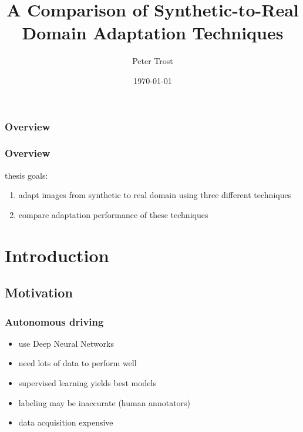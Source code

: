 \documentclass{beamer}
\title[A Comparison of Synthetic-to-Real Domain Adaptation Techniques]{A Comparison of Synthetic-to-Real Domain Adaptation Techniques} %
\author{Peter Trost} %
\institute[Universität Tübingen] %
{
Eberhard Karls Universität Tübingen \\
Mathematisch-Naturwissenschaftliche Fakultät\\
Wilhelm-Schickard-Institut für Informatik\\
Lernbasierte Computer Vision\\ %
\medskip
\textit{peter.trost@student.uni-tuebingen.de} %
}
\date{\today} %
\begin{document}
\begin{frame}
\titlepage %
\end{frame}

\begin{frame}
\frametitle{Overview} %
\tableofcontents %
\end{frame}

\begin{frame}
	\frametitle{Overview}
	thesis goals:
	\begin{enumerate}
		\item adapt images from synthetic to real domain using three different techniques
		\item compare adaptation performance of these techniques
	\end{enumerate}
\end{frame}

\section{Introduction}

\subsection{Motivation}

\begin{frame}
	\frametitle{Autonomous driving}
	\begin{itemize}
		\item use Deep Neural Networks
		\item need lots of data to perform well
		\item supervised learning yields best models
		\item labeling may be inaccurate (human annotators)
		\item data acquisition expensive
	\end{itemize}
\end{frame}
\end{document}
